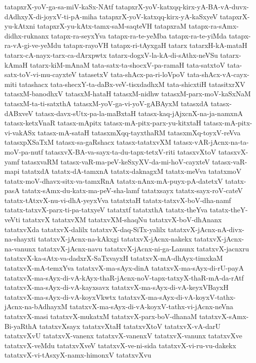 {tatapxrX-yoV-ga-sa-miV-kaSx-NAtf
tatapxrX-yoV-katxqq-kirx-yA-BA-vA-duvx-dAdhxyX-di-joyxV-ti-pA-miha
tatapxrX-yoV-katxqq-kirx-yA-kaSxyeV
tatapxrX-yu-kAtxni
tatapxrX-yu-kAtx-tamx-saM-saqteVH
tatapxraM
tatapx-ra-sAmx-didhx-ruknanx
tatapx-ra-seyxYva
tatapx-ra-te-yeMba
tatapx-ra-te-yiMda
tatapx-ra-vA-gi-ve-yeMdu
tatapx-rayoVH
tatapx-ri-tAyxgaH
tatarx
tatarxH-kA-mataH
tatarx-cA-nayx-tarx-ca-dArxpwtx
tatarx-dogxV-la-kA-di-sAthx-neVSu
tatarx-kAmaH
tatarx-kiM-mAnaM
tata-satx-ta-shocxV-pa-ramaH
tata-satxtoV
tata-satx-toV-vi-mu-cayxteV
tatasetxV
tata-shAcx-pa-ri-loVpoV
tata-shAcx-vA-cayx-miti
tatashacx
tata-shecxY-ta-daBx-veV-tisxdadhxM
tata-shicxtiH
tatasitxrXV
tatasxM-banodhxV
tatasxM-hataH
tatasxM-nidhw
tatasxM-parx-moV-kaSxNaM
tatasxM-ta-ti-satxthA
tatasxM-yoV-ga-vi-yoV-gABAyxM
tatasxdA
tatasx-dABxveV
tatasx-davx-sUtx-pa-la-maBxtaH
tatasx-kaq-jAjxcnX-na-ja-namxnA
tatasx-ketxVnaR
tatasx-mApitx
tatasx-mA-pitx-parx-yu-kitxtaH
tatasx-mA-pitx-vi-vakASx
tatasx-mA-sataH
tatasxmXqq-tayxthaRM
tatasxmXq-toyxV-reVva
tatasxpXSaTxM
tatasx-sa-gaRshacx
tatasx-tatatxvXM
tatasx-vAR-jAcnx-na-ta-moV-pa-nutf
tatasxvX-BA-va-sayx-ta-du-tapx-tetxV-riti
tatasxvXtoV
tatasxvX-yamf
tatasxvaRM
tatasx-vaR-ma-peV-keSxyXV-da-mi-hoV-cayxteV
tatasx-vaR-mapi
tatatxdA
tatatx-dA-tamxnA
tatatx-daknagxM
tatatx-meVva
tatatxmoV
tatatx-moV-dhavx-sitx-va-tamxRnA
tatatx-nAnx-mA-puyx-pA-datetxV
tatatx-pasA
tatatx-sAmx-du-katx-ma-peV-sha-lamf
tatatxsayx
tatatx-sayx-roV-cateV
tatatx-tAtxvX-nu-vi-dhA-yeyxVva
tatatxtaH
tatatx-tatxvX-boV-dha-namf
tatatx-tatxvX-parx-ti-pa-tatxyeV
tatatxtf
tatatxthA
tatatx-theYva
tatatx-theY-veVti
tatatxvX
tatatxvXM
tatatxvXM-shaqNu
tatatxvX-boV-dhAnanx
tatatxvXda
tatatxvX-dalilx
tatatxvX-daq-SiTx-yalilx
tatatxvX-jAcnx-nA-divx-na-shayxti
tatatxvX-jAcnx-na-kAkxgi
tatatxvX-jAcnx-nakekx
tatatxvX-jAcnx-na-vanunx
tatatxvX-jAcnx-navu
tatatxvX-jAcnx-ni-ga-Lanunx
tatatxvX-jacnxru
tatatxvX-ka-sAtx-va-dadxrX-SaTxvayxH
tatatxvX-mA-dhAyx-timxkaM
tatatxvX-mA-temxYva
tatatxvX-ma-sAyx-dinA
tatatxvX-ma-sAyx-di-rU-payA
tatatxvX-ma-sAyx-di-vA-kAyx-thaR-jAcnx-noV-tapx-tatxyX-thaR-mA-da-rAtf
tatatxvX-ma-sAyx-di-vA-kayxsavx
tatatxvX-ma-sAyx-di-vA-keyxVBayxH
tatatxvX-ma-sAyx-di-vA-koyxVkwtx
tatatxvX-ma-sAyx-di-vA-koyxV-tathx-jAcnx-na-bAdhayxM
tatatxvX-ma-sAyx-di-vA-koyxV-tathx-vi-jAcnx-neVna
tatatxvX-masi
tatatxvX-mukatxM
tatatxvX-parx-boV-dhanaM
tatatxvX-sAmx-Bi-yaRthA
tatatxvXsayx
tatatxvXtaH
tatatxvXtoV
tatatxvX-vA-darU
tatatxvXvU
tatatxvX-vanenx
tatatxvX-vanenxV
tatatxvX-vanunx
tatatxvXve
tatatxvX-veMdu
tatatxvXveV
tatatxvX-ve-ni-sida
tatatxvX-vi-ru-vu-dakekx
tatatxvX-vi-tAsxyX-namx-himonxV
tatatxvXvu
}
